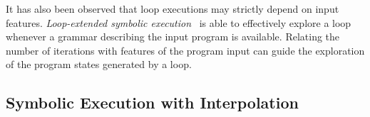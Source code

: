 It has also been observed that loop executions may strictly depend on input features. {\em Loop-extended symbolic execution}~\cite{SPM-ISSTA09} is able to effectively explore a loop whenever a grammar describing the input program is available. Relating the number of iterations with features of the program input can guide the exploration of the program states generated by a loop.


\subsection{Symbolic Execution with Interpolation} 
\label{ss:interpolation}
